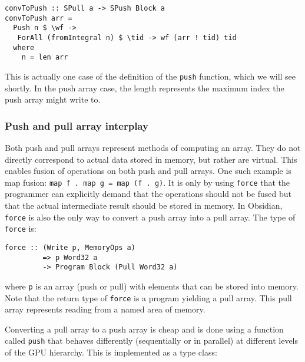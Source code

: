 \begin{small} 
\begin{verbatim} 
convToPush :: SPull a -> SPush Block a
convToPush arr =
  Push n $ \wf ->
   ForAll (fromIntegral n) $ \tid -> wf (arr ! tid) tid
  where
    n = len arr       
\end{verbatim}
\end{small}

\noindent
This is actually one case of the definition of the \verb!push! function, which we will see shortly.
In the push array case, the length represents the maximum index the push array 
might write to.

\subsubsection{Push and pull array interplay} 
\label{sec:interplay}

Both push and pull arrays represent methods of computing an array. They 
do not directly correspond to actual data stored in memory, but rather 
are virtual. This enables fusion of operations on both push and pull arrays. 
One such example is map fusion: \verb!map f . map g = map (f . g)!. It is 
only by using {\tt force} that the programmer can explicitly demand that the 
operations should not be fused but that the actual intermediate result should 
be stored in memory. In Obsidian, {\tt force} is also the only way 
to convert a push array into a pull array. 
The type of {\tt force} is: 
\begin{small} 
\begin{Verbatim}[samepage=true] 
force :: (Write p, MemoryOps a) 
         => p Word32 a 
         -> Program Block (Pull Word32 a)
\end{Verbatim}
\end{small}

\noindent
where {\tt p} is an array (push or pull) with elements that can be stored into memory. 
Note that the return type of {\tt force} is a program yielding a pull array. This pull 
array represents reading from a named area of memory. 

Converting a pull array to a push array is cheap and is done using a function called {\tt push} that behaves differently (sequentially or in parallel) at different levels
of the GPU hierarchy. This is implemented as a type class: 

